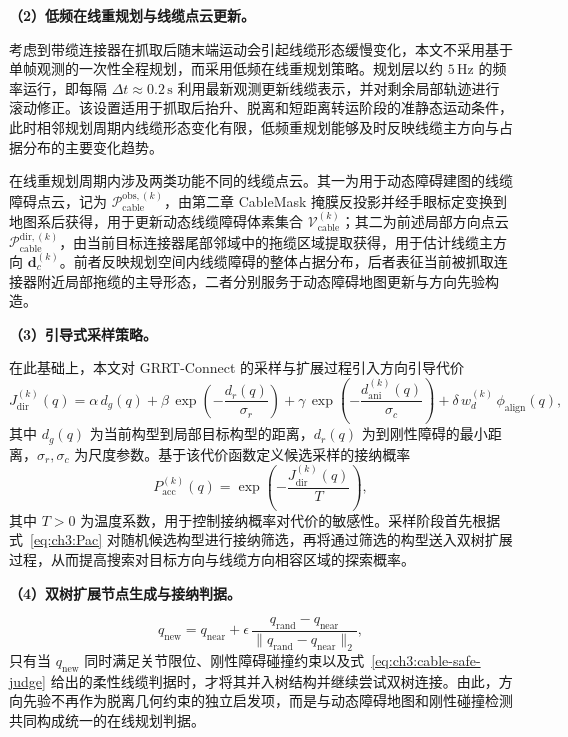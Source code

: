 \textbf{（2）低频在线重规划与线缆点云更新。}

考虑到带缆连接器在抓取后随末端运动会引起线缆形态缓慢变化，本文不采用基于单帧观测的一次性全程规划，而采用低频在线重规划策略。规划层以约 $5\,\mathrm{Hz}$ 的频率运行，即每隔 $\Delta t\approx 0.2\,\mathrm{s}$ 利用最新观测更新线缆表示，并对剩余局部轨迹进行滚动修正。该设置适用于抓取后抬升、脱离和短距离转运阶段的准静态运动条件，此时相邻规划周期内线缆形态变化有限，低频重规划能够及时反映线缆主方向与占据分布的主要变化趋势。

在线重规划周期内涉及两类功能不同的线缆点云。其一为用于动态障碍建图的线缆障碍点云，记为 $\mathcal{P}_{\mathrm{cable}}^{\mathrm{obs},(k)}$，由第二章 CableMask 掩膜反投影并经手眼标定变换到地图系后获得，用于更新动态线缆障碍体素集合 $\mathcal{V}_{\mathrm{cable}}^{(k)}$；其二为前述局部方向点云 $\mathcal{P}_{\mathrm{cable}}^{\mathrm{dir},(k)}$，由当前目标连接器尾部邻域中的拖缆区域提取获得，用于估计线缆主方向 $\mathbf{d}_c^{(k)}$。前者反映规划空间内线缆障碍的整体占据分布，后者表征当前被抓取连接器附近局部拖缆的主导形态，二者分别服务于动态障碍地图更新与方向先验构造。

\textbf{（3）引导式采样策略。}

在此基础上，本文对 GRRT-Connect 的采样与扩展过程引入方向引导代价
\begin{equation}
  J_{\mathrm{dir}}^{(k)}(q)=
  \alpha\,d_g(q)+
  \beta\,\exp\!\left(-\frac{d_r(q)}{\sigma_r}\right)+
  \gamma\,\exp\!\left(-\frac{d_{\mathrm{ani}}^{(k)}(q)}{\sigma_c}\right)+
  \delta\,w_d^{(k)}\,\phi_{\mathrm{align}}(q),
  \label{eq:ch3:Jdir}
\end{equation}
其中 $d_g(q)$ 为当前构型到局部目标构型的距离，$d_r(q)$ 为到刚性障碍的最小距离，$\sigma_r,\sigma_c$ 为尺度参数。基于该代价函数定义候选采样的接纳概率
\begin{equation}
  P_{\mathrm{acc}}^{(k)}(q)=\exp\!\left(-\frac{J_{\mathrm{dir}}^{(k)}(q)}{T}\right),
  \label{eq:ch3:Pac}
\end{equation}
其中 $T>0$ 为温度系数，用于控制接纳概率对代价的敏感性。采样阶段首先根据式~\eqref{eq:ch3:Pac} 对随机候选构型进行接纳筛选，再将通过筛选的构型送入双树扩展过程，从而提高搜索对目标方向与线缆方向相容区域的探索概率。

\textbf{（4）双树扩展节点生成与接纳判据。}

\begin{equation}
  q_{\mathrm{new}}=
  q_{\mathrm{near}}+\epsilon\,
  \frac{q_{\mathrm{rand}}-q_{\mathrm{near}}}{\|q_{\mathrm{rand}}-q_{\mathrm{near}}\|_2},
  \label{eq:ch3:qnew}
\end{equation}
只有当 $q_{\mathrm{new}}$ 同时满足关节限位、刚性障碍碰撞约束以及式~\eqref{eq:ch3:cable-safe-judge} 给出的柔性线缆判据时，才将其并入树结构并继续尝试双树连接。由此，方向先验不再作为脱离几何约束的独立启发项，而是与动态障碍地图和刚性碰撞检测共同构成统一的在线规划判据。


